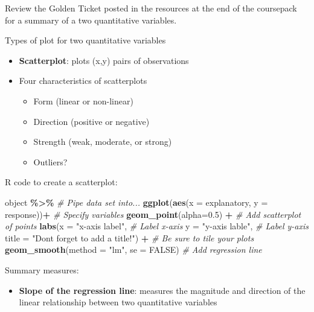 \documentclass[
]{report}
\newenvironment{Shaded}{\begin{snugshade}}{\end{snugshade}}
\newcommand{\AttributeTok}[1]{\textcolor[rgb]{0.13,0.29,0.53}{#1}}
\newcommand{\CommentTok}[1]{\textcolor[rgb]{0.56,0.35,0.01}{\textit{#1}}}
\newcommand{\ConstantTok}[1]{\textcolor[rgb]{0.56,0.35,0.01}{#1}}
\newcommand{\FloatTok}[1]{\textcolor[rgb]{0.00,0.00,0.81}{#1}}
\newcommand{\FunctionTok}[1]{\textcolor[rgb]{0.13,0.29,0.53}{\textbf{#1}}}
\newcommand{\NormalTok}[1]{#1}
\newcommand{\SpecialCharTok}[1]{\textcolor[rgb]{0.81,0.36,0.00}{\textbf{#1}}}
\newcommand{\StringTok}[1]{\textcolor[rgb]{0.31,0.60,0.02}{#1}}
\providecommand{\tightlist}{%
  \setlength{\itemsep}{0pt}\setlength{\parskip}{0pt}}
\begin{document}
Review the Golden Ticket posted in the resources at the end of the coursepack for a summary of a two quantitative variables.

Types of plot for two quantitative variables

\begin{itemize}
\item
  \textbf{Scatterplot}: plots (x,y) pairs of observations
\item
  Four characteristics of scatterplots

  \begin{itemize}
  \item
    Form (linear or non-linear)
  \item
    Direction (positive or negative)
  \item
    Strength (weak, moderate, or strong)
  \item
    Outliers?
  \end{itemize}
\end{itemize}

R code to create a scatterplot:

\begin{Shaded}
\begin{Highlighting}[]
\NormalTok{object }\SpecialCharTok{\%\textgreater{}\%} \CommentTok{\# Pipe data set into...}
\FunctionTok{ggplot}\NormalTok{(}\FunctionTok{aes}\NormalTok{(}\AttributeTok{x =}\NormalTok{ explanatory, }\AttributeTok{y =}\NormalTok{ response))}\SpecialCharTok{+}  \CommentTok{\# Specify variables}
  \FunctionTok{geom\_point}\NormalTok{(}\AttributeTok{alpha=}\FloatTok{0.5}\NormalTok{) }\SpecialCharTok{+}  \CommentTok{\# Add scatterplot of points}
  \FunctionTok{labs}\NormalTok{(}\AttributeTok{x =} \StringTok{"x{-}axis label"}\NormalTok{,  }\CommentTok{\# Label x{-}axis}
       \AttributeTok{y =} \StringTok{"y{-}axis lable"}\NormalTok{,  }\CommentTok{\# Label y{-}axis}
       \AttributeTok{title =} \StringTok{"Don\textquotesingle{}t forget to add a title!"}\NormalTok{) }\SpecialCharTok{+} 
               \CommentTok{\# Be sure to tile your plots}
  \FunctionTok{geom\_smooth}\NormalTok{(}\AttributeTok{method =} \StringTok{"lm"}\NormalTok{, }\AttributeTok{se =} \ConstantTok{FALSE}\NormalTok{)  }\CommentTok{\# Add regression line}
\end{Highlighting}
\end{Shaded}

Summary measures:

\begin{itemize}
\tightlist
\item
  \textbf{Slope of the regression line}: measures the magnitude and direction of the linear relationship between two quantitative variables
\end{itemize}
\end{document}
